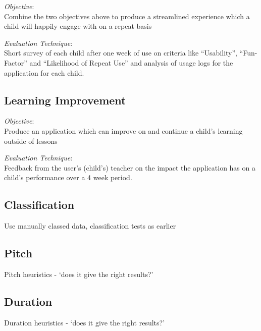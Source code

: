 \emph{Objective}: \\
Combine the two objectives above to produce a streamlined experience which a child will happily engage with on a repeat basis

\emph{Evaluation Technique}: \\
Short survey of each child after one week of use on criteria like ``Usability'', ``Fun-Factor'' and ``Likelihood of Repeat Use'' and analysis of usage logs for the application for each child.

\subsection{Learning Improvement}

\emph{Objective}: \\
Produce an application which can improve on and continue a child's learning outside of lessons

\emph{Evaluation Technique}: \\
Feedback from the user's (child's) teacher on the impact the application has on a child's performance over a 4 week period.

\subsection{Classification}
Use manually classed data, classification tests as earlier

\subsection{Pitch}
Pitch heuristics - `does it give the right results?'

\subsection{Duration}
Duration heuristics - `does it give the right results?'

\clearpage
